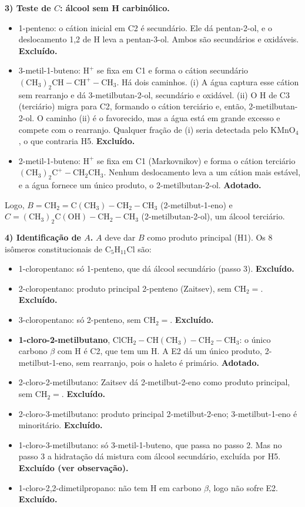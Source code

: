 \documentclass{article}%
\begin{document}
\textbf{3) Teste de $C$: álcool sem H carbinólico.}
\begin{itemize}
\item 1-penteno: o cátion inicial em C2 é secundário. Ele dá pentan-2-ol, e o deslocamento 1,2 de H leva a pentan-3-ol. Ambos são secundários e oxidáveis. \textbf{Excluído.}
\item 3-metil-1-buteno: $\mathrm{H^+}$ se fixa em C1 e forma o cátion secundário $\mathrm{(CH_3)_2CH-CH^{+}-CH_3}$. Há dois caminhos. (i) A água captura esse cátion sem rearranjo e dá 3-metilbutan-2-ol, secundário e oxidável. (ii) O H de C3 (terciário) migra para C2, formando o cátion terciário e, então, 2-metilbutan-2-ol. O caminho (ii) é o favorecido, mas a água está em grande excesso e compete com o rearranjo. Qualquer fração de (i) seria detectada pelo $\mathrm{KMnO_4}$, o que contraria H5. \textbf{Excluído.}
\item 2-metil-1-buteno: $\mathrm{H^+}$ se fixa em C1 (Markovnikov) e forma o cátion terciário $\mathrm{(CH_3)_2C^{+}-CH_2CH_3}$. Nenhum deslocamento leva a um cátion mais estável, e a água fornece um único produto, o 2-metilbutan-2-ol. \textbf{Adotado.}
\end{itemize}

Logo, $B=\mathrm{CH_2=C(CH_3)-CH_2-CH_3}$ (2-metilbut-1-eno) e $C=\mathrm{(CH_3)_2C(OH)-CH_2-CH_3}$ (2-metilbutan-2-ol), um álcool terciário.

\textbf{4) Identificação de $A$.} $A$ deve dar $B$ como produto principal (H1). Os 8 isômeros constitucionais de $\mathrm{C_5H_{11}Cl}$ são:
\begin{itemize}
\item 1-cloropentano: só 1-penteno, que dá álcool secundário (passo 3). \textbf{Excluído.}
\item 2-cloropentano: produto principal 2-penteno (Zaitsev), sem $\mathrm{CH_2=}$. \textbf{Excluído.}
\item 3-cloropentano: só 2-penteno, sem $\mathrm{CH_2=}$. \textbf{Excluído.}
\item \textbf{1-cloro-2-metilbutano}, $\mathrm{ClCH_2-CH(CH_3)-CH_2-CH_3}$: o único carbono $\beta$ com H é C2, que tem um H. A E2 dá um único produto, 2-metilbut-1-eno, sem rearranjo, pois o haleto é primário. \textbf{Adotado.}
\item 2-cloro-2-metilbutano: Zaitsev dá 2-metilbut-2-eno como produto principal, sem $\mathrm{CH_2=}$. \textbf{Excluído.}
\item 2-cloro-3-metilbutano: produto principal 2-metilbut-2-eno; 3-metilbut-1-eno é minoritário. \textbf{Excluído.}
\item 1-cloro-3-metilbutano: só 3-metil-1-buteno, que passa no passo 2. Mas no passo 3 a hidratação dá mistura com álcool secundário, excluída por H5. \textbf{Excluído (ver observação).}
\item 1-cloro-2,2-dimetilpropano: não tem H em carbono $\beta$, logo não sofre E2. \textbf{Excluído.}
\end{itemize}
\end{document}
